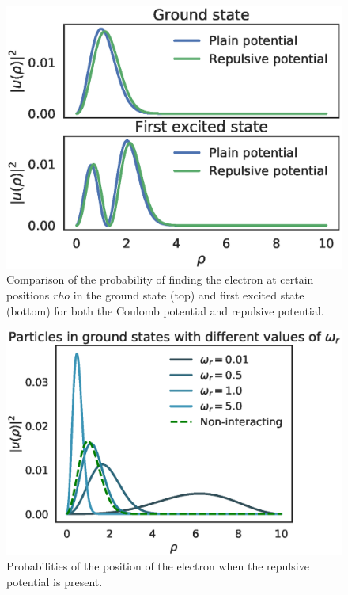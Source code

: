 \documentclass[aps,reprint]{revtex4-1}
\begin{document}
\begin{figure}[ht]
  \centering
  \includegraphics[width=\columnwidth]{figures/excitation.eps}
  \caption{\label{fig:excitation} Comparison of the probability of finding the
    electron at certain positions \(rho\) in the ground state (top) and first
    excited state (bottom) for both the Coulomb potential and repulsive potential.}
\end{figure}


\begin{figure}[ht]
  \centering
  \includegraphics[width=\columnwidth]{figures/omegas.eps}
  \caption{\label{fig:omegas} Probabilities of the position of the electron when
  the repulsive potential is present.}
\end{figure}
\end{document}
